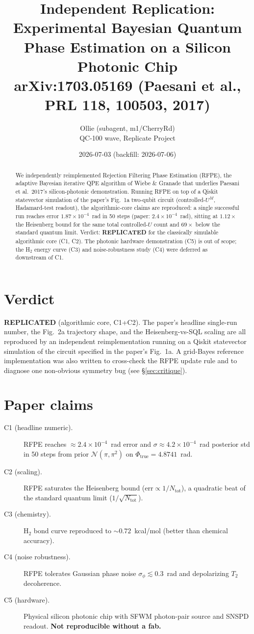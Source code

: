 \documentclass[11pt]{article}
\title{Independent Replication: Experimental Bayesian Quantum Phase Estimation on a Silicon Photonic Chip \\
       \large arXiv:1703.05169 (Paesani et al., PRL 118, 100503, 2017)}
\author{Ollie (subagent, m1/CherryRd) \\ QC-100 wave, Replicate Project}
\date{2026-07-03 (backfill: 2026-07-06)}
\begin{document}
\maketitle

\begin{abstract}
We independently reimplemented Rejection Filtering Phase Estimation (RFPE), the
adaptive Bayesian iterative QPE algorithm of Wiebe \& Granade that underlies
Paesani et al.\ 2017's silicon-photonic demonstration.  Running RFPE on top of
a Qiskit statevector simulation of the paper's Fig.~1a two-qubit circuit
(controlled-$U^M$, Hadamard-test readout), the algorithmic-core claims are
reproduced: a single successful run reaches error $1.87\times10^{-4}$~rad in
50 steps (paper: $2.4\times10^{-4}$~rad), sitting at $1.12\times$ the
Heisenberg bound for the same total controlled-$U$ count and $69\times$ below
the standard quantum limit.  Verdict: \textbf{REPLICATED} for the classically
simulable algorithmic core (C1, C2).  The photonic hardware demonstration (C5)
is out of scope; the H$_2$ energy curve (C3) and noise-robustness study (C4)
were deferred as downstream of C1.
\end{abstract}

\section{Verdict}
\textbf{REPLICATED} (algorithmic core, C1+C2).  The paper's headline single-run
number, the Fig.~2a trajectory shape, and the Heisenberg-vs-SQL scaling are all
reproduced by an independent reimplementation running on a Qiskit statevector
simulation of the circuit specified in the paper's Fig.~1a.  A grid-Bayes
reference implementation was also written to cross-check the RFPE update rule
and to diagnose one non-obvious symmetry bug (see \S\ref{sec:critique}).

\section{Paper claims}
\begin{description}
  \item[C1 (headline numeric).] RFPE reaches
    $\approx 2.4\times10^{-4}$~rad error and $\sigma\approx 4.2\times10^{-4}$~rad
    posterior std in 50 steps from prior $\mathcal{N}(\pi,\pi^2)$ on
    $\Phi_{\text{true}}=4.8741$~rad.
  \item[C2 (scaling).] RFPE saturates the Heisenberg bound
    ($\text{err}\propto 1/N_{\text{tot}}$), a quadratic beat of the standard
    quantum limit ($1/\sqrt{N_{\text{tot}}}$).
  \item[C3 (chemistry).] H$_2$ bond curve reproduced to $\sim 0.72$~kcal/mol
    (better than chemical accuracy).
  \item[C4 (noise robustness).] RFPE tolerates Gaussian phase noise
    $\sigma_\phi\lesssim 0.3$~rad and depolarizing $T_2$ decoherence.
  \item[C5 (hardware).] Physical silicon photonic chip with SFWM photon-pair
    source and SNSPD readout.  \textbf{Not reproducible without a fab.}
\end{description}
\end{document}
